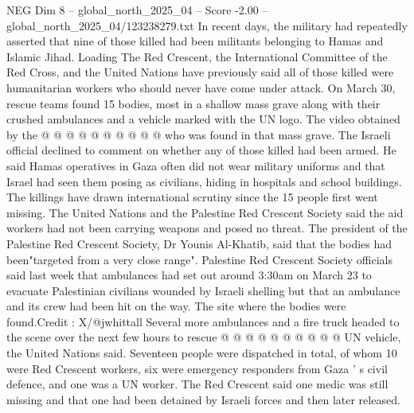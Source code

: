 \begin{textsample}{NEG Dim 8 – global\_north\_2025\_04 – Score -2.00 – global\_north\_2025\_04/123238279.txt}
In recent days, the military had repeatedly asserted that nine of those killed had been militants belonging to Hamas and Islamic Jihad.
Loading The Red Crescent, the International Committee of the Red Cross, and the United Nations have previously said all of those killed were humanitarian workers who should never have come under attack.
On March 30, rescue teams found 15 bodies, most in a shallow mass grave along with their crushed ambulances and a vehicle marked with the UN logo.
The video obtained by the @ @ @ @ @ @ @ @ @ @ who was found in that mass grave.
The Israeli official declined to comment on whether any of those killed had been armed.
He said Hamas operatives in Gaza often did not wear military uniforms and that Israel had seen them posing as civilians, hiding in hospitals and school buildings.
The killings have drawn international scrutiny since the 15 people first went missing.
The United Nations and the Palestine Red Crescent Society said the aid workers had not been carrying weapons and posed no threat.
The president of the Palestine Red Crescent Society, Dr Younis Al-Khatib, said that the bodies had been"targeted from a very close range".
Palestine Red Crescent Society officials said last week that ambulances had set out around 3:30am on March 23 to evacuate Palestinian civilians wounded by Israeli shelling but that an ambulance and its crew had been hit on the way.
The site where the bodies were found.Credit : X/@jwhittall Several more ambulances and a fire truck headed to the scene over the next few hours to rescue @ @ @ @ @ @ @ @ @ @ UN vehicle, the United Nations said.
Seventeen people were dispatched in total, of whom 10 were Red Crescent workers, six were emergency responders from Gaza ' s civil defence, and one was a UN worker.
The Red Crescent said one medic was still missing and that one had been detained by Israeli forces and then later released.

\end{textsample}
